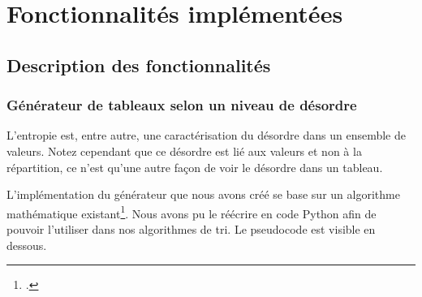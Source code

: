 \documentclass[10pt,a4paper]{article}
\begin{document}
     
\section{Fonctionnalités implémentées}
    \subsection{Description des fonctionnalités}

        \subsubsection{Générateur de tableaux selon un niveau de désordre}
        L'entropie est, entre autre, une caractérisation du désordre dans un ensemble de valeurs. Notez cependant que ce désordre est lié aux valeurs et non à la répartition, ce n'est qu'une autre façon de voir le désordre dans un tableau. 

        \medskip
        L'implémentation du générateur que nous avons créé se base sur un algorithme mathématique existant\footcite{SWASZEK200097}. Nous avons pu le réécrire en code Python afin de pouvoir l'utiliser dans nos algorithmes de tri. Le pseudocode est visible en dessous.

        \pagebreak
\end{document}
